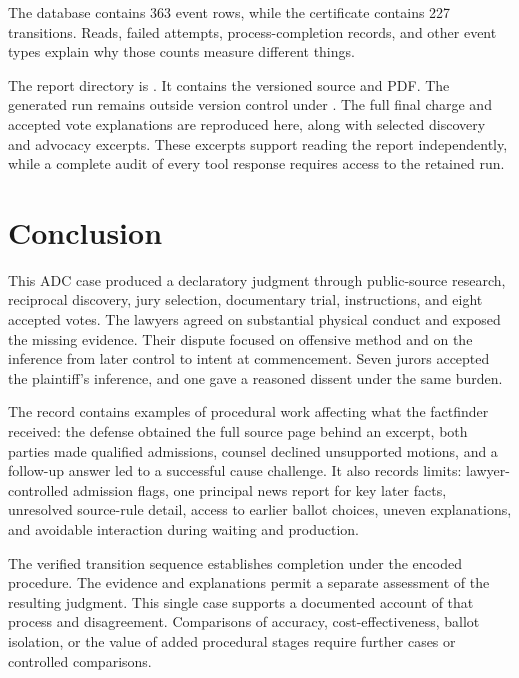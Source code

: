 The database contains 363 event rows, while the certificate contains 227 transitions.  Reads, failed attempts, process-completion records, and other event types explain why those counts measure different things.

The report directory is .  It contains the versioned source and PDF.  The generated run remains outside version control under .  The full final charge and accepted vote explanations are reproduced here, along with selected discovery and advocacy excerpts.  These excerpts support reading the report independently, while a complete audit of every tool response requires access to the retained run.

\section{Conclusion}

This ADC case produced a declaratory judgment through public-source research, reciprocal discovery, jury selection, documentary trial, instructions, and eight accepted votes.  The lawyers agreed on substantial physical conduct and exposed the missing evidence.  Their dispute focused on offensive method and on the inference from later control to intent at commencement.  Seven jurors accepted the plaintiff's inference, and one gave a reasoned dissent under the same burden.

The record contains examples of procedural work affecting what the factfinder received: the defense obtained the full source page behind an excerpt, both parties made qualified admissions, counsel declined unsupported motions, and a follow-up answer led to a successful cause challenge.  It also records limits: lawyer-controlled admission flags, one principal news report for key later facts, unresolved source-rule detail, access to earlier ballot choices, uneven explanations, and avoidable interaction during waiting and production.

The verified transition sequence establishes completion under the encoded procedure.  The evidence and explanations permit a separate assessment of the resulting judgment.  This single case supports a documented account of that process and disagreement.  Comparisons of accuracy, cost-effectiveness, ballot isolation, or the value of added procedural stages require further cases or controlled comparisons.
